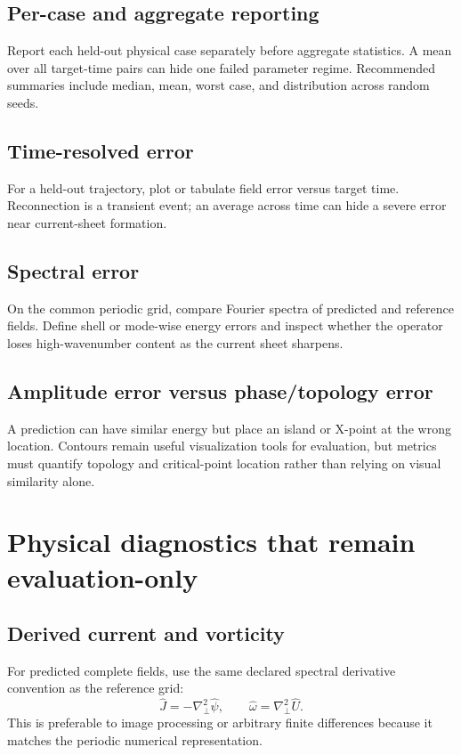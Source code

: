\documentclass[11pt]{article}
\newcommand{\Lap}{\nabla_\perp^2}
\begin{document}
\subsection{Per-case and aggregate reporting}
Report each held-out physical case separately before aggregate statistics. A mean over all target-time pairs can hide one failed parameter regime. Recommended summaries include median, mean, worst case, and distribution across random seeds.

\subsection{Time-resolved error}
For a held-out trajectory, plot or tabulate field error versus target time. Reconnection is a transient event; an average across time can hide a severe error near current-sheet formation.

\subsection{Spectral error}
On the common periodic grid, compare Fourier spectra of predicted and reference fields. Define shell or mode-wise energy errors and inspect whether the operator loses high-wavenumber content as the current sheet sharpens.

\subsection{Amplitude error versus phase/topology error}
A prediction can have similar energy but place an island or X-point at the wrong location. Contours remain useful visualization tools for evaluation, but metrics must quantify topology and critical-point location rather than relying on visual similarity alone.

\section{Physical diagnostics that remain evaluation-only}
\label{sec:diagnostics}

\subsection{Derived current and vorticity}
For predicted complete fields, use the same declared spectral derivative convention as the reference grid:
\[
\widehat J=-\Lap\widehat\psi,\qquad
\widehat\omega=\Lap\widehat U.
\]
This is preferable to image processing or arbitrary finite differences because it matches the periodic numerical representation.
\end{document}
